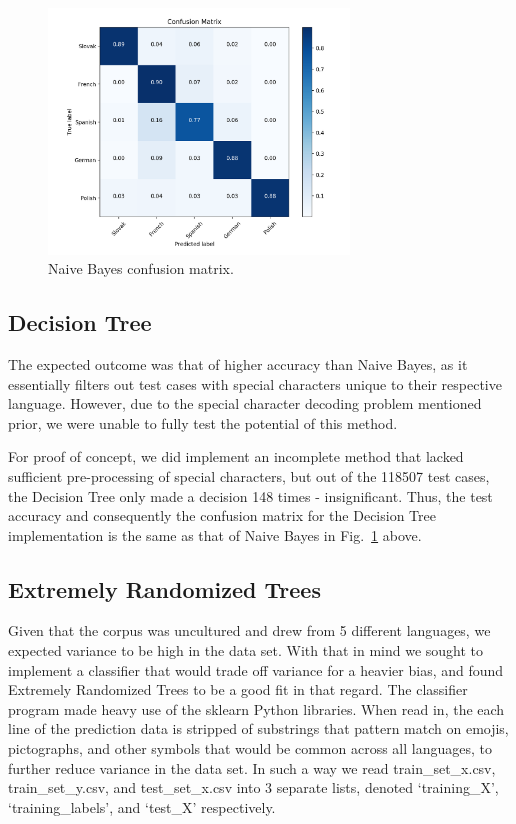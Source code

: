 \documentclass[conference]{IEEEtran}
\begin{document}
\begin{figure}[htbp]
\centering
\includegraphics[width=80mm]{confusion_bayes.png}
\caption{Naive Bayes confusion matrix.}
\label{confusion_bayes}
\end{figure}

\subsection{Decision Tree}
The expected outcome was that of higher accuracy than Naive Bayes, as it essentially filters out test cases with special characters unique to their respective language. However, due to the special character decoding problem mentioned prior, we were unable to fully test the potential of this method.

For proof of concept, we did implement an incomplete method that lacked sufficient pre-processing of special characters, but out of the 118507 test cases, the Decision Tree only made a decision 148 times - insignificant. Thus, the test accuracy and consequently the confusion matrix for the Decision Tree implementation is the same as that of Naive Bayes in Fig.~\ref{confusion_bayes} above.



\subsection{Extremely Randomized Trees}
Given that the corpus was uncultured and drew from 5 different languages, we expected variance to be high in the data set. With that in mind we sought to implement a classifier that would trade off variance for a heavier bias, and found Extremely Randomized Trees to be a good fit in that regard. The classifier program made heavy use of the sklearn Python libraries. When read in, the each line of the prediction data is stripped of substrings that pattern match on emojis, pictographs, and other symbols that would be common across all languages, to further reduce variance in the data set. In such a way we read train_set_x.csv, train_set_y.csv, and test_set_x.csv into 3 separate lists, denoted ‘training_X’, ‘training_labels’, and ‘test_X’ respectively.
\end{document}
